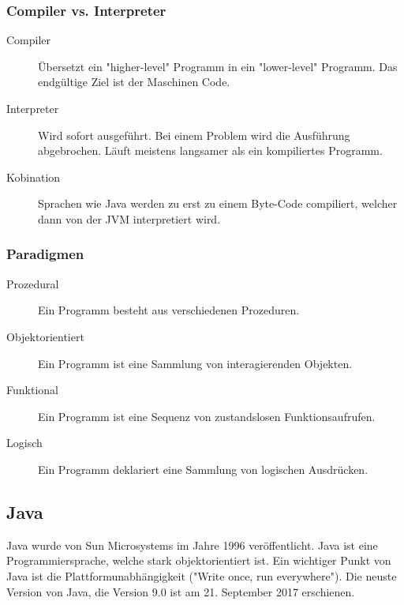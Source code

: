 \documentclass[12pt, a4paper, oneside]{article}
\begin{document}
\subsubsection{Compiler vs. Interpreter}
\begin{description}
    \item[Compiler] Übersetzt ein "higher-level" Programm in ein "lower-level" Programm. Das endgültige Ziel ist der Maschinen Code.
    \item[Interpreter] Wird sofort ausgeführt. Bei einem Problem wird die Ausführung abgebrochen. Läuft meistens langsamer als ein kompiliertes Programm.
    \item[Kobination] Sprachen wie Java werden zu erst zu einem Byte-Code compiliert, welcher dann von der JVM interpretiert wird.
\end{description}

\subsubsection{Paradigmen}
\begin{description}
    \item[Prozedural] Ein Programm besteht aus verschiedenen Prozeduren.
    \item[Objektorientiert] Ein Programm ist eine Sammlung von interagierenden Objekten.
    \item[Funktional] Ein Programm ist eine Sequenz von zustandslosen Funktionsaufrufen.
    \item[Logisch] Ein Programm deklariert eine Sammlung von logischen Ausdrücken.
\end{description}

\subsection{Java}
 Java wurde von Sun Microsystems im Jahre 1996 veröffentlicht. Java ist eine Programmiersprache, welche stark objektorientiert ist. Ein wichtiger Punkt von Java ist die Plattformunabhängigkeit ("Write once, run everywhere"). Die neuste Version von Java, die Version 9.0 ist am 21. September 2017 erschienen.
\end{document}
